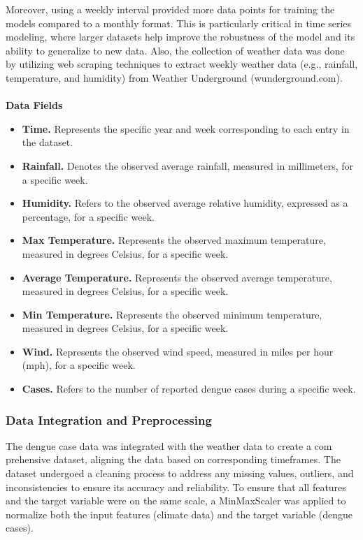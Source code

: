Moreover, using a weekly interval provided more data points for training the models compared to a monthly format. This is particularly critical in time series modeling, where larger datasets help improve the robustness of the model and its ability to generalize to new data. Also, the collection of weather data was done by utilizing web scraping techniques to extract weekly weather data (e.g., rainfall, temperature, and humidity) from Weather Underground (wunderground.com).
\\
\\
\textbf{Data Fields}
\begin{itemize}
	\item \textbf{Time.} Represents the specific year and week corresponding to each entry in the dataset.
	\item \textbf{Rainfall.} Denotes the observed average rainfall, measured in millimeters, for a specific week.
	\item \textbf{Humidity.} Refers to the observed average relative humidity, expressed as a percentage, for a specific week.    
	\item \textbf{Max Temperature.} Represents the observed maximum temperature, measured in degrees Celsius, for a specific week.
	\item \textbf{Average Temperature.} Represents the observed average temperature, measured in degrees Celsius, for a specific week.
	\item \textbf{Min Temperature.} Represents the observed minimum temperature, measured in degrees Celsius, for a specific week.
	\item \textbf{Wind.} Represents the observed wind speed, measured in miles per hour (mph), for a specific week.
	\item \textbf{Cases.} Refers to the number of reported dengue cases during a specific week.
\end{itemize} 

\subsubsection{Data Integration and Preprocessing}
The dengue case data was integrated with the weather data to create a com
prehensive dataset, aligning the data based on corresponding timeframes. The
dataset undergoed a cleaning process to address any missing values, outliers,
and inconsistencies to ensure its accuracy and reliability. To ensure that all
features and the target variable were on the same scale, a MinMaxScaler was
applied to normalize both the input features (climate data)
and the target variable (dengue cases).

